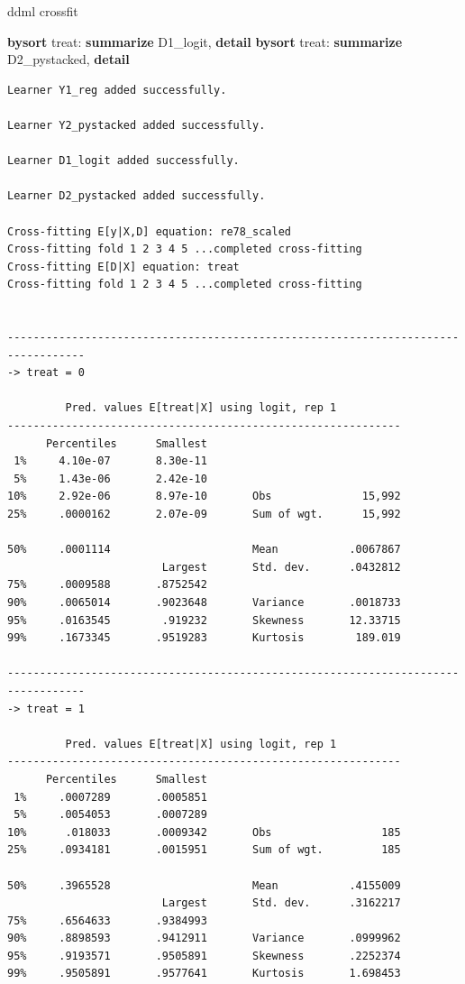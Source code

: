 \documentclass[
]{book}
\newenvironment{Shaded}{\begin{snugshade}}{\end{snugshade}}
\newcommand{\KeywordTok}[1]{\textcolor[rgb]{0.13,0.29,0.53}{\textbf{#1}}}
\newcommand{\NormalTok}[1]{#1}
\begin{document}
\begin{Shaded}
\begin{Highlighting}[]
\NormalTok{ddml crossfit}

\KeywordTok{bysort}\NormalTok{ treat: }\KeywordTok{summarize}\NormalTok{ D1\_logit, }\KeywordTok{detail}
\KeywordTok{bysort}\NormalTok{ treat: }\KeywordTok{summarize}\NormalTok{ D2\_pystacked, }\KeywordTok{detail}
\end{Highlighting}
\end{Shaded}

\begin{verbatim}
Learner Y1_reg added successfully.

Learner Y2_pystacked added successfully.

Learner D1_logit added successfully.

Learner D2_pystacked added successfully.

Cross-fitting E[y|X,D] equation: re78_scaled
Cross-fitting fold 1 2 3 4 5 ...completed cross-fitting
Cross-fitting E[D|X] equation: treat
Cross-fitting fold 1 2 3 4 5 ...completed cross-fitting


----------------------------------------------------------------------------------
-> treat = 0

         Pred. values E[treat|X] using logit, rep 1
-------------------------------------------------------------
      Percentiles      Smallest
 1%     4.10e-07       8.30e-11
 5%     1.43e-06       2.42e-10
10%     2.92e-06       8.97e-10       Obs              15,992
25%     .0000162       2.07e-09       Sum of wgt.      15,992

50%     .0001114                      Mean           .0067867
                        Largest       Std. dev.      .0432812
75%     .0009588       .8752542
90%     .0065014       .9023648       Variance       .0018733
95%     .0163545        .919232       Skewness       12.33715
99%     .1673345       .9519283       Kurtosis        189.019

----------------------------------------------------------------------------------
-> treat = 1

         Pred. values E[treat|X] using logit, rep 1
-------------------------------------------------------------
      Percentiles      Smallest
 1%     .0007289       .0005851
 5%     .0054053       .0007289
10%      .018033       .0009342       Obs                 185
25%     .0934181       .0015951       Sum of wgt.         185

50%     .3965528                      Mean           .4155009
                        Largest       Std. dev.      .3162217
75%     .6564633       .9384993
90%     .8898593       .9412911       Variance       .0999962
95%     .9193571       .9505891       Skewness       .2252374
99%     .9505891       .9577641       Kurtosis       1.698453




\end{verbatim}
\end{document}
